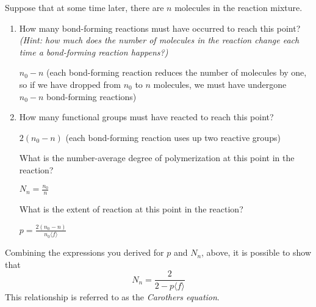 \begin{activity}
\begin{ctqs}
	\question Suppose that at some time later, there are $n$ molecules in the reaction mixture.
	
		\begin{enumerate}
		
			\item How many bond-forming reactions must have occurred to reach this point?  \emph{(Hint: how much does the number of molecules in the reaction change each time a bond-forming reaction happens?)}
			
				\begin{solution}[0.5in]
					$n_0 - n$ (each bond-forming reaction reduces the number of molecules by one, so if we have dropped from $n_0$ to $n$ molecules, we must have undergone $n_0-n$ bond-forming reactions)
				\end{solution}
		
			\item How many functional groups must have reacted to reach this point?
			
				\begin{solution}[0.5in]
					$2(n_0-n)$ (each bond-forming reaction uses up two reactive groups)
				\end{solution}
			
			\question What is the number-average degree of polymerization at this point in the reaction?
			
				\begin{solution}[0.5in]
					$N_n = \frac{n_0}{n}$
				\end{solution}
			
			\question What is the extent of reaction at this point in the reaction?
			
				\begin{solution}[0.5in]
					$p = \frac{2(n_0-n)}{n_0\langle f \rangle}$
				\end{solution}
		
		\end{enumerate}
	
\end{ctqs}

\begin{infobox}
	Combining the expressions you derived for $p$ and $N_n$, above, it is possible to show that
	\begin{equation*}
		N_n = \frac{2}{2-p\langle f \rangle}
	\end{equation*}
	This relationship is referred to as the \emph{Carothers equation}.
\end{infobox}


\end{activity}
